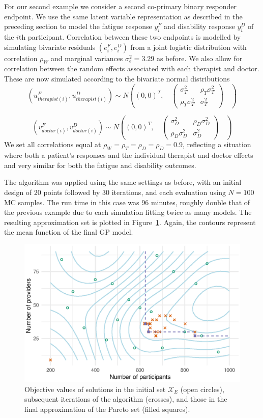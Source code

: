 \documentclass[sagev, doublespace, Crown]{sagej}
\begin{document}
For our second example we consider a second co-primary binary responder endpoint. We use the same latent variable representation as described in the preceding section to model the fatigue response $y_i^F$ and disability response $y_i^D$ of the $i$th participant. Correlation between these two endpoints is modelled by simulating bivariate residuals $(e_i^F, e_i^D)$ from a joint logistic distribution with correlation $\rho_W$ and marginal variances $\sigma_e^2 = 3.29$ as before. We also allow for correlation between the random effects associated with each therapist and doctor. These are now simulated according to the bivariate normal distributions
$$
(u_{therapist(i)}^F, u_{therapist(i)}^D) \sim N\left( (0,0)^T, \quad
\begin{pmatrix} 
\sigma_T^2 & \rho_T \sigma_T^2 \\
\rho_T \sigma_T^2  & \sigma_T^2 
\end{pmatrix}
\quad \right)
$$

$$
(v_{doctor(i)}^F, v_{doctor(i)}^D) \sim N\left( (0,0)^T, \quad
\begin{pmatrix} 
\sigma_D^2  & \rho_D \sigma_D^2  \\
\rho_D \sigma_D^2  & \sigma_D^2 
\end{pmatrix}
\quad \right)
$$
We set all correlations equal at $\rho_W = \rho_T = \rho_D = \rho_D = 0.9$, reflecting a situation where both a patient's responses and the individual therapist and doctor effects and very similar for both the fatigue and disability outcomes. 

The algorithm was applied using the same settings as before, with an initial design of 20 points followed by 30 iterations, and each evaluation using $N = 100$ MC samples. The run time in this case was 96 minutes, roughly double that of the previous example due to each simulation fitting twice as many models. The resulting approximation set is plotted in Figure~\ref{fig:ex2_single_run}. Again, the contours represent the mean function of the final GP model. 

\begin{figure}
\centering
\includegraphics[scale=0.8]{fig6_ex2_single_run.eps}
\caption{Objective values of solutions in the initial set $\mathcal{X}_{E}$ (open circles), subsequent iterations of the algorithm (crosses), and those in the final approximation of the Pareto set (filled squares).}
\label{fig:ex2_single_run}
\end{figure}
\end{document}
